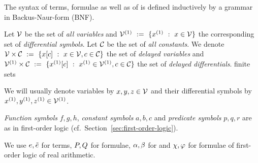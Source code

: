     The syntax of \ddL terms, formulae as well as of \dHPs is defined inductively by a grammar in Backus-Naur-form (BNF).

    Let $\mathcal{V}$ be the set of \emph{all variables} and $\diffvars\defeq\{\D{x} \with x\in\allvars\}$ the corresponding set of \emph{differential symbols}.
    Let $\mathcal{C}_{}$ be the set of \emph{all constants}. We denote $\mathcal{V}\times\mathcal{C}_{}~\mathrel{\mathop{:}}=~\{x[c] ~\mathrel{\mathop{:}}~ x\in\mathcal{V}, c\in\mathcal{C}_{}\}$ the set of \emph{delayed variables} and $\delaydiffvars\defeq\{\Dxtau[c] \with \D{x}\in\diffvars, c\in\constants\}$ the set of \emph{delayed differentials}.
    finite sets

    We will usually denote variables by $x,y,z\in\mathcal{V}$ and their differential symbols by $\D{x},\D{y},\D{z}\in\diffvars$.

    \emph{Function symbols} $f,g,h$, \emph{constant symbols} $a,b,c$ and \emph{predicate symbols} $p,q,r$ are as in first-order logic (cf.\ Section~\ref{sec:first-order-logic}).

    We use $e,\tilde{e}$ for \ddL terms, $P,Q$ for \ddL formulae, $\alpha,\beta$ for \dHPs and $\chi,\varphi$ for formulae of first-order logic of real arithmetic.


